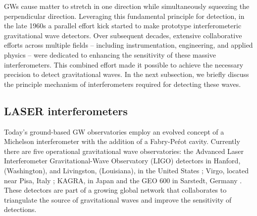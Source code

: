 GWs cause matter to stretch in one direction while simultaneously squeezing the perpendicular direction. Leveraging this fundamental principle for detection, in the late 1960s a parallel effort kick started to make prototype interferometeric gravitational wave detectors. Over subsequent decades, extensive collaborative efforts across multiple fields – including instrumentation, engineering, and applied physics – were dedicated to enhancing the sensitivity of these massive interferometers. This combined effort made it possible to achieve the necessary precision to detect gravitational waves. In the next subsection, we briefly discuss the principle mechanism of interferometers required for detecting these waves. 


\subsection{LASER interferometers}
Today's ground-based GW observatories employ an evolved concept of a Michelson interferometer with the addition of a Fabry-Pe\'rot cavity. Currently there are five operational gravitational wave observatories: the Advanced Laser Interferometer Gravitational-Wave Observatory (LIGO) detectors in Hanford, (Washington), and Livingston, (Louisiana), in the United States \cite{LIGOScientific:2014pky}; Virgo, located near Pisa, Italy \cite{VIRGOdetector}; KAGRA, in Japan \cite{KAGRA:2018plz} and the GEO 600 in Sarstedt, Germany \cite{Dooley:2015fpa}. These detectors are part of a growing global network that collaborates to triangulate the source of gravitational waves and improve the sensitivity of detections. 




